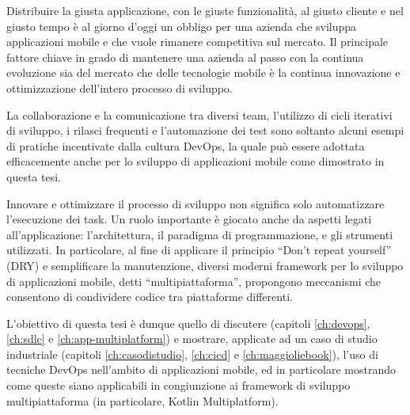 
Distribuire la giusta applicazione, con le giuste funzionalità, al giusto cliente e nel giusto tempo è al giorno d'oggi un obbligo per una azienda che sviluppa applicazioni mobile e che vuole rimanere competitiva sul mercato. Il principale fattore chiave in grado di mantenere una azienda al passo con la continua evoluzione sia del mercato che delle tecnologie mobile è la continua innovazione e ottimizzazione dell'intero processo di sviluppo.

La collaborazione e la comunicazione tra diversi team, l'utilizzo di cicli iterativi di sviluppo, i rilasci frequenti e l'automazione dei test sono soltanto alcuni esempi di pratiche incentivate dalla cultura DevOps, la quale può essere adottata efficacemente anche per lo sviluppo di applicazioni mobile come dimostrato in questa tesi.

Innovare e ottimizzare il processo di sviluppo non significa solo automatizzare l'esecuzione dei task.
Un ruolo importante è giocato anche da aspetti legati all'applicazione:
l'architettura,
il paradigma di programmazione,
e gli strumenti utilizzati.
In particolare,
al fine di applicare il principio ``Don't repeat yourself'' (DRY) e semplificare la manutenzione,
diversi moderni framework per lo sviluppo di applicazioni mobile,
detti ``multipiattaforma'', 
propongono meccanismi che consentono di condividere codice tra piattaforme differenti.

L'obiettivo di questa tesi è dunque quello di discutere
(capitoli \ref{ch:devops}, \ref{ch:sdlc} e \ref{ch:app-multiplatform})
e mostrare, applicate ad un caso di studio industriale
(capitoli \ref{ch:casodistudio}, \ref{ch:cicd} e \ref{ch:maggioliebook}),
l'uso di tecniche DevOps
nell'ambito di applicazioni mobile,
ed in particolare mostrando come queste siano applicabili in congiunzione
ai framework di sviluppo multipiattaforma (in particolare, Kotlin Multiplatform).
